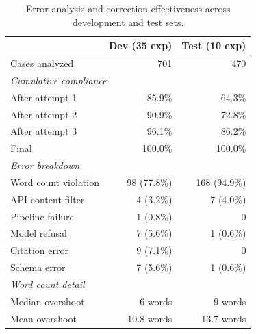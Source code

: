 \begin{table}[t]
\centering
\caption{Error analysis and correction effectiveness across development and test sets.}
\label{tab:error-analysis}
\small
\begin{tabular}{lrr}
\toprule
 & Dev (35 exp) & Test (10 exp) \\
\midrule
Cases analyzed & 701 & 470 \\
\midrule
\multicolumn{3}{l}{\textit{Cumulative compliance}} \\
\quad After attempt 1 & 85.9\% & 64.3\% \\
\quad After attempt 2 & 90.9\% & 72.8\% \\
\quad After attempt 3 & 96.1\% & 86.2\% \\
\quad Final & 100.0\% & 100.0\% \\
\midrule
\multicolumn{3}{l}{\textit{Error breakdown}} \\
\quad Word count violation & 98 (77.8\%) & 168 (94.9\%) \\
\quad API content filter & 4 (3.2\%) & 7 (4.0\%) \\
\quad Pipeline failure & 1 (0.8\%) & 0 \\
\quad Model refusal & 7 (5.6\%) & 1 (0.6\%) \\
\quad Citation error & 9 (7.1\%) & 0 \\
\quad Schema error & 7 (5.6\%) & 1 (0.6\%) \\
\midrule
\multicolumn{3}{l}{\textit{Word count detail}} \\
\quad Median overshoot & 6 words & 9 words \\
\quad Mean overshoot & 10.8 words & 13.7 words \\
\bottomrule
\end{tabular}
\end{table}